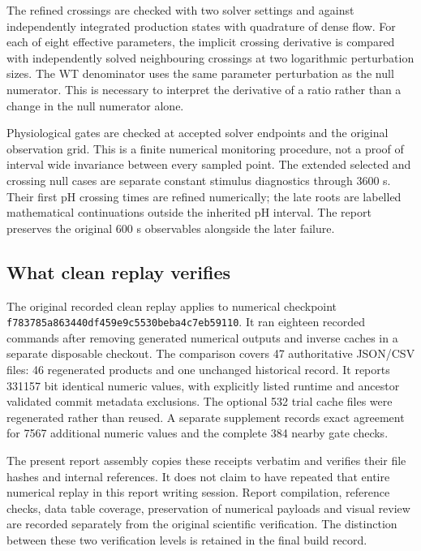 The refined crossings are checked with two solver settings and against independently integrated production states with quadrature of dense flow. For each of eight effective parameters, the implicit crossing derivative is compared with independently solved neighbouring crossings at two logarithmic perturbation sizes. The WT denominator uses the same parameter perturbation as the null numerator. This is necessary to interpret the derivative of a ratio rather than a change in the null numerator alone.

Physiological gates are checked at accepted solver endpoints and the original observation grid. This is a finite numerical monitoring procedure, not a proof of interval wide invariance between every sampled point. The extended selected and crossing null cases are separate constant stimulus diagnostics through 3600 s. Their first pH crossing times are refined numerically; the late roots are labelled mathematical continuations outside the inherited pH interval. The report preserves the original 600 s observables alongside the later failure.

\subsection{What clean replay verifies}
The original recorded clean replay applies to numerical checkpoint \nolinkurl{f783785a863440df459e9c5530beba4c7eb59110}. It ran eighteen recorded commands after removing generated numerical outputs and inverse caches in a separate disposable checkout. The comparison covers 47 authoritative JSON/CSV files: 46 regenerated products and one unchanged historical record. It reports 331157 bit identical numeric values, with explicitly listed runtime and ancestor validated commit metadata exclusions. The optional 532 trial cache files were regenerated rather than reused. A separate supplement records exact agreement for 7567 additional numeric values and the complete 384 nearby gate checks.

The present report assembly copies these receipts verbatim and verifies their file hashes and internal references. It does not claim to have repeated that entire numerical replay in this report writing session. Report compilation, reference checks, data table coverage, preservation of numerical payloads and visual review are recorded separately from the original scientific verification. The distinction between these two verification levels is retained in the final build record.
